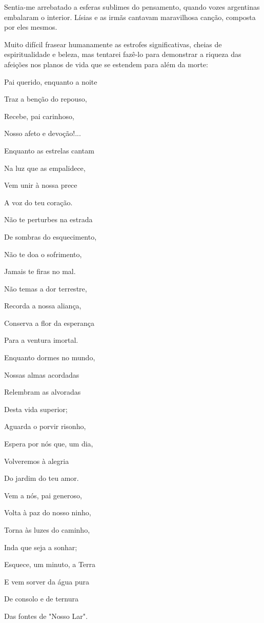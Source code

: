 \documentclass[portuguese,12pt,a4paper]{scrbook}
\begin{document}
	Sentia-me arrebatado a esferas sublimes do pensamento, quando vozes argentinas embalaram o interior. Lísias e as irmãs cantavam maravilhosa canção, composta por eles mesmos.
	
	Muito difícil frasear humanamente as estrofes significativas, cheias de espiritualidade e beleza, mas tentarei fazê-lo para demonstrar a riqueza das afeições nos planos de vida que se estendem para além da morte:
	
	Pai querido, enquanto a noite
	
	Traz a benção do repouso,
	
	Recebe, pai carinhoso,
	
	Nosso afeto e devoção!...
	
	Enquanto as estrelas cantam
	
	Na luz que as empalidece,
	
	Vem unir à nossa prece
	
	A voz do teu coração.
	
	Não te perturbes na estrada
	
	De sombras do esquecimento,
	
	Não te doa o sofrimento,
	
	Jamais te firas no mal.
	
	Não temas a dor terrestre,
	
	Recorda a nossa aliança,
	
	Conserva a flor da esperança
	
	Para a ventura imortal.
	
	Enquanto dormes no mundo,
	
	Nossas almas acordadas
	
	
	Relembram as alvoradas
	
	Desta vida superior;
	
	Aguarda o porvir risonho,
	
	Espera por nós que, um dia,
	
	Volveremos à alegria
	
	Do jardim do teu amor.
	
	Vem a nós, pai generoso,
	
	Volta à paz do nosso ninho,
	
	Torna às luzes do caminho,
	
	Inda que seja a sonhar;
	
	Esquece, um minuto, a Terra
	
	E vem sorver da água pura
	
	De consolo e de ternura
	
	Das fontes de "Nosso Lar".
	
\end{document}

